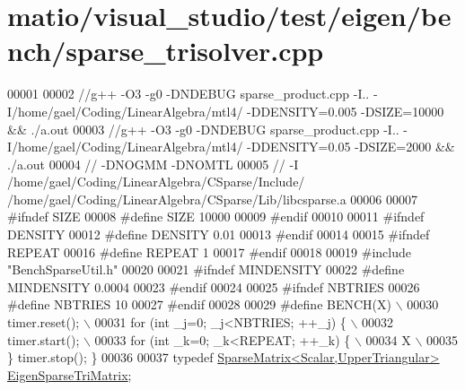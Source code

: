 \hypertarget{matio_2visual__studio_2test_2eigen_2bench_2sparse__trisolver_8cpp_source}{}\section{matio/visual\+\_\+studio/test/eigen/bench/sparse\+\_\+trisolver.cpp}
\label{matio_2visual__studio_2test_2eigen_2bench_2sparse__trisolver_8cpp_source}

\begin{DoxyCode}
00001 
00002 \textcolor{comment}{//g++ -O3 -g0 -DNDEBUG  sparse\_product.cpp -I.. -I/home/gael/Coding/LinearAlgebra/mtl4/ -DDENSITY=0.005
       -DSIZE=10000 && ./a.out}
00003 \textcolor{comment}{//g++ -O3 -g0 -DNDEBUG  sparse\_product.cpp -I.. -I/home/gael/Coding/LinearAlgebra/mtl4/ -DDENSITY=0.05
       -DSIZE=2000 && ./a.out}
00004 \textcolor{comment}{// -DNOGMM -DNOMTL}
00005 \textcolor{comment}{// -I /home/gael/Coding/LinearAlgebra/CSparse/Include/
       /home/gael/Coding/LinearAlgebra/CSparse/Lib/libcsparse.a}
00006 
00007 \textcolor{preprocessor}{#ifndef SIZE}
00008 \textcolor{preprocessor}{#define SIZE 10000}
00009 \textcolor{preprocessor}{#endif}
00010 
00011 \textcolor{preprocessor}{#ifndef DENSITY}
00012 \textcolor{preprocessor}{#define DENSITY 0.01}
00013 \textcolor{preprocessor}{#endif}
00014 
00015 \textcolor{preprocessor}{#ifndef REPEAT}
00016 \textcolor{preprocessor}{#define REPEAT 1}
00017 \textcolor{preprocessor}{#endif}
00018 
00019 \textcolor{preprocessor}{#include "BenchSparseUtil.h"}
00020 
00021 \textcolor{preprocessor}{#ifndef MINDENSITY}
00022 \textcolor{preprocessor}{#define MINDENSITY 0.0004}
00023 \textcolor{preprocessor}{#endif}
00024 
00025 \textcolor{preprocessor}{#ifndef NBTRIES}
00026 \textcolor{preprocessor}{#define NBTRIES 10}
00027 \textcolor{preprocessor}{#endif}
00028 
00029 \textcolor{preprocessor}{#define BENCH(X) \(\backslash\)}
00030 \textcolor{preprocessor}{  timer.reset(); \(\backslash\)}
00031 \textcolor{preprocessor}{  for (int \_j=0; \_j<NBTRIES; ++\_j) \{ \(\backslash\)}
00032 \textcolor{preprocessor}{    timer.start(); \(\backslash\)}
00033 \textcolor{preprocessor}{    for (int \_k=0; \_k<REPEAT; ++\_k) \{ \(\backslash\)}
00034 \textcolor{preprocessor}{        X  \(\backslash\)}
00035 \textcolor{preprocessor}{  \} timer.stop(); \}}
00036 
00037 \textcolor{keyword}{typedef} \hyperlink{group___sparse_core___module_class_eigen_1_1_sparse_matrix}{SparseMatrix<Scalar,UpperTriangular>} 
      \hyperlink{group___sparse_core___module_class_eigen_1_1_sparse_matrix}{EigenSparseTriMatrix};

\end{DoxyCode}
